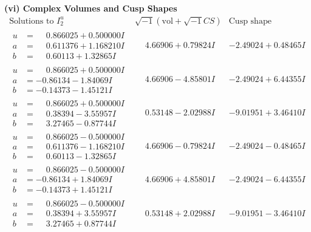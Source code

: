 \documentclass[1p]{elsarticle_modified}
\theoremstyle{definition}
\newcommand{\I}{\sqrt{-1}}
\begin{document}
\newpage\flushleft \textbf{(vi) Complex Volumes and Cusp Shapes}
$$\begin{array}{c|c|c}  
\text{Solutions to }I^u_{2}& \I (\text{vol} + \sqrt{-1}CS) & \text{Cusp shape}\\
 \hline 
\begin{aligned}
u &= \phantom{-}0.866025 + 0.500000 I \\
a &= \phantom{-}0.611376 + 1.168210 I \\
b &= \phantom{-}0.60113 + 1.32865 I\end{aligned}
 & \phantom{-}4.66906 + 0.79824 I & -2.49024 + 0.48465 I \\ \hline\begin{aligned}
u &= \phantom{-}0.866025 + 0.500000 I \\
a &= -0.86134 - 1.84069 I \\
b &= -0.14373 - 1.45121 I\end{aligned}
 & \phantom{-}4.66906 - 4.85801 I & -2.49024 + 6.44355 I \\ \hline\begin{aligned}
u &= \phantom{-}0.866025 + 0.500000 I \\
a &= \phantom{-}0.38394 - 3.55957 I \\
b &= \phantom{-}3.27465 - 0.87744 I\end{aligned}
 & \phantom{-}0.53148 - 2.02988 I & -9.01951 + 3.46410 I \\ \hline\begin{aligned}
u &= \phantom{-}0.866025 - 0.500000 I \\
a &= \phantom{-}0.611376 - 1.168210 I \\
b &= \phantom{-}0.60113 - 1.32865 I\end{aligned}
 & \phantom{-}4.66906 - 0.79824 I & -2.49024 - 0.48465 I \\ \hline\begin{aligned}
u &= \phantom{-}0.866025 - 0.500000 I \\
a &= -0.86134 + 1.84069 I \\
b &= -0.14373 + 1.45121 I\end{aligned}
 & \phantom{-}4.66906 + 4.85801 I & -2.49024 - 6.44355 I \\ \hline\begin{aligned}
u &= \phantom{-}0.866025 - 0.500000 I \\
a &= \phantom{-}0.38394 + 3.55957 I \\
b &= \phantom{-}3.27465 + 0.87744 I\end{aligned}
 & \phantom{-}0.53148 + 2.02988 I & -9.01951 - 3.46410 I \\ \hline\begin{aligned}

\end{aligned}
\end{array}$$
\end{document}
